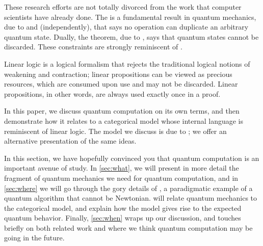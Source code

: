 These research efforts are not totally divorced from the work that computer
scientists have already done.  The  is a fundamental
result in quantum mechanics, due to \cite{wootters1982single} and
\cite{dieks1982communication} (independently), that says no operation can
duplicate an arbitrary quantum state.  Dually, the  theorem,
due to \cite{pati2000impossibility}, says that quantum states cannot be discarded.  These
constraints are strongly reminiscent of .

Linear logic is a logical formalism that rejects the traditional logical
notions of weakening and contraction; linear propositions can be viewed as
precious resources, which are consumed upon use and may not be discarded.
Linear propositions, in other words, are always used exactly once in a proof.

In this paper, we discuss quantum computation on its own terms, and then
demonstrate how it relates to a categorical model whose internal language is
reminiscent of linear logic.  The model we discuss is due to \cite{abramsky2009categorical};
we offer an alternative presentation of the same ideas.

In this section, we have hopefully convinced you that quantum computation is an
important avenue of study.  In \cref{sec:what}, we will present in more detail
the fragment of quantum mechanics we need for quantum computation, and in
\cref{sec:where} we will go through the gory details of , a paradigmatic example of a quantum algorithm that cannot be
Newtonian.   will relate quantum mechanics to the categorical model,
and explain how the model gives rise to the expected quantum behavior.  Finally,
\cref{sec:when} wraps up our discussion, and touches briefly on both related
work and where we think quantum computation may be going in the future.
